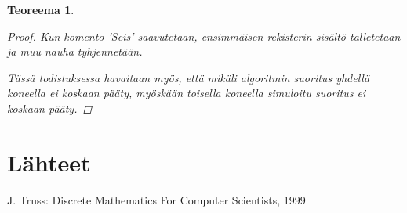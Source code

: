\documentclass[a4paper, 12pt]{article}
\newtheorem{teor}{Teoreema}
\begin{document}
\begin{teor}
\begin{proof}
Kun komento 'Seis' saavutetaan, ensimmäisen rekisterin sisältö talletetaan ja muu nauha tyhjennetään.

\qedhere

Tässä todistuksessa havaitaan myös, että mikäli algoritmin suoritus yhdellä koneella ei koskaan pääty, myöskään toisella koneella simuloitu suoritus ei koskaan pääty.

\end{proof}
\end{teor}

\appendix

\section{Lähteet}
J. Truss: Discrete Mathematics For Computer Scientists, 1999
\end{document}
